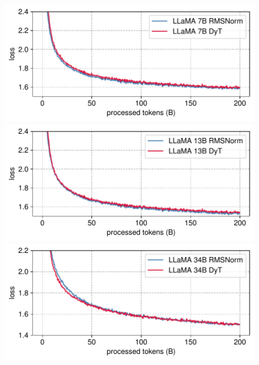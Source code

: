 \begin{figure}[t]
\vspace{-0.5in}
\centering
\begin{minipage}{0.49\textwidth}
\hspace*{-0.25cm}
\includegraphics[width=\textwidth]{figures/llama_loss_7b.pdf}
\end{minipage}
\hfill
\begin{minipage}{0.49\textwidth}
\hspace*{-0.6cm}
  \includegraphics[width=\textwidth]{figures/llama_loss_13b.pdf}
\end{minipage}
\vfill
\begin{minipage}{0.49\textwidth}
\vspace*{-0.1cm}
\hspace*{-0.25cm}
\includegraphics[width=\textwidth]{figures/llama_loss_34b.pdf}

\end{minipage}
\end{figure}
